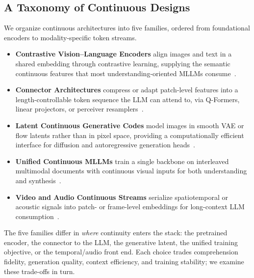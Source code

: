 \subsection{A Taxonomy of Continuous Designs}
\label{subsec:continuous-taxonomy}

We organize continuous architectures into five families, ordered from foundational encoders to modality-specific token streams.

\begin{itemize}
    \item \textbf{Contrastive Vision--Language Encoders} align images and text in a shared embedding through contrastive learning, supplying the semantic continuous features that most understanding-oriented MLLMs consume~\cite{radford2021clip,sun2023evaclip,zhai2023siglip}.
    \item \textbf{Connector Architectures} compress or adapt patch-level features into a length-controllable token sequence the LLM can attend to, via Q-Formers, linear projectors, or perceiver resamplers~\cite{li2023blip2,liu2023llava,dai2023instructblip,alayrac2022flamingo}.
    \item \textbf{Latent Continuous Generative Codes} model images in smooth VAE or flow latents rather than in pixel space, providing a computationally efficient interface for diffusion and autoregressive generation heads~\cite{kingma2014vae,rombach2022ldm}.
    \item \textbf{Unified Continuous MLLMs} train a single backbone on interleaved multimodal documents with continuous visual inputs for both understanding and synthesis~\cite{zhou2024transfusion,sun2024emu2,dong2024dreamllm,tian2024mminterleaved,tong2025metamorph,xu2025pisces,deng2025bagel}.
    \item \textbf{Video and Audio Continuous Streams} serialize spatiotemporal or acoustic signals into patch- or frame-level embeddings for long-context LLM consumption~\cite{bertasius2021timesformer,tong2022videomae,liu2024valor,liu2025tuna,baevski2020wav2vec,radford2023whisper,elizalde2023clap,girdhar2023imagebind}.
\end{itemize}

The five families differ in \emph{where} continuity enters the stack: the pretrained encoder, the connector to the LLM, the generative latent, the unified training objective, or the temporal/audio front end. Each choice trades comprehension fidelity, generation quality, context efficiency, and training stability; we examine these trade-offs in turn.

